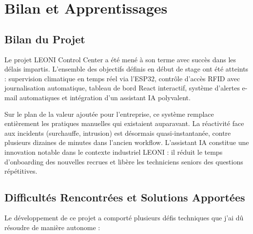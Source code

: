 \documentclass[12pt,a4paper]{report}
\begin{document}
\chapter{Bilan et Apprentissages}

\section{Bilan du Projet}
Le projet LEONI Control Center a été mené à son terme avec succès dans les délais impartis. L'ensemble des objectifs définis en début de stage ont été atteints : supervision climatique en temps réel via l'ESP32, contrôle d'accès RFID avec journalisation automatique, tableau de bord React interactif, système d'alertes e-mail automatiques et intégration d'un assistant IA polyvalent.

Sur le plan de la valeur ajoutée pour l'entreprise, ce système remplace entièrement les pratiques manuelles qui existaient auparavant. La réactivité face aux incidents (surchauffe, intrusion) est désormais quasi-instantanée, contre plusieurs dizaines de minutes dans l'ancien workflow. L'assistant IA constitue une innovation notable dans le contexte industriel LEONI : il réduit le temps d'onboarding des nouvelles recrues et libère les techniciens seniors des questions répétitives.

\section{Difficultés Rencontrées et Solutions Apportées}
Le développement de ce projet a comporté plusieurs défis techniques que j'ai dû résoudre de manière autonome :
\end{document}
